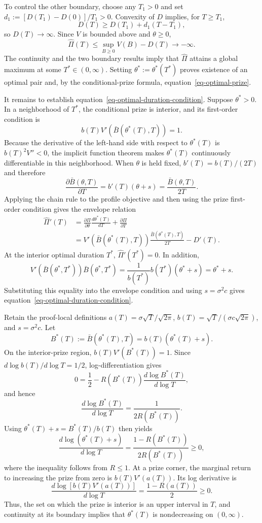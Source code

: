 \documentclass[mnsc]{informs3}
\begin{document}
\begin{APPENDICES}
To control the other boundary, choose any $T_1>0$ and set $d_1:=[D(T_1)-D(0)]/T_1>0$. Convexity of $D$ implies, for $T\geq T_1$,
\[
D(T)\geq D(T_1)+d_1(T-T_1),
\]
so $D(T)\to\infty$. Since $V$ is bounded above and $\theta\geq0$,
\[
\widehat\Pi(T)
\leq\sup_{B\geq0}V(B)-D(T)
\longrightarrow-\infty.
\]
The continuity and the two boundary results imply that $\widehat\Pi$ attains a global maximum at some $T^*\in(0,\infty)$. Setting $\theta^*:=\theta^*(T^*)$ proves existence of an optimal pair and, by the conditional-prize formula, equation~\eqref{eq-optimal-prize}.

It remains to establish equation~\eqref{eq-optimal-duration-condition}. Suppose $\theta^*>0$. In a neighborhood of $T^*$, the conditional prize is interior, and its first-order condition is
\[
b(T)V'\!\left(\bar B(\theta^*(T),T)\right)=1.
\]
Because the derivative of the left-hand side with respect to $\theta^*(T)$ is $b(T)^2V''<0$, the implicit function theorem makes $\theta^*(T)$ continuously differentiable in this neighborhood.
When $\theta$ is held fixed, $b'(T)=b(T)/(2T)$ and therefore
\[
\frac{\partial\bar B(\theta,T)}{\partial T}
=b'(T)(\theta+s)
=\frac{\bar B(\theta,T)}{2T}.
\]
Applying the chain rule to the profile objective and then using the prize first-order condition gives the envelope relation
\[
\begin{aligned}
\widehat\Pi'(T)
&=\frac{\partial\Pi}{\partial\theta}
\frac{d\theta^*(T)}{dT}
+\frac{\partial\Pi}{\partial T}\\
&=V'\!\left(\bar B(\theta^*(T),T)\right)
\frac{\bar B(\theta^*(T),T)}{2T}-D'(T).
\end{aligned}
\]
At the interior optimal duration $T^*$, $\widehat\Pi'(T^*)=0$. In addition,
\[
V'\!\left(\bar B(\theta^*,T^*)\right)\bar B(\theta^*,T^*)
=\frac{1}{b(T^*)}b(T^*)(\theta^*+s)
=\theta^*+s.
\]
Substituting this equality into the envelope condition and using $s=\sigma^2c$ gives equation~\eqref{eq-optimal-duration-condition}.
\Halmos
\endproof

Retain the proof-local definitions $a(T)=\sigma\sqrt T/\sqrt{2\pi}$, $b(T)=\sqrt T/(\sigma c\sqrt{2\pi})$, and $s=\sigma^2c$. Let
\[
B^*(T):=\bar B(\theta^*(T),T)=b(T)(\theta^*(T)+s).
\]
On the interior-prize region, $b(T)V'(B^*(T))=1$. Since $d\log b(T)/d\log T=1/2$, log-differentiation gives
\[
0=\frac12-R(B^*(T))\frac{d\log B^*(T)}{d\log T},
\]
and hence
\[
\frac{d\log B^*(T)}{d\log T}
=\frac{1}{2R(B^*(T))}.
\]
Using $\theta^*(T)+s=B^*(T)/b(T)$ then yields
\[
\frac{d\log(\theta^*(T)+s)}{d\log T}
=\frac{1-R(B^*(T))}{2R(B^*(T))}\geq0,
\]
where the inequality follows from $R\leq1$. At a prize corner, the marginal return to increasing the prize from zero is $b(T)V'(a(T))$. Its log derivative is
\[
\frac{d\log[b(T)V'(a(T))]}{d\log T}
=\frac{1-R(a(T))}{2}\geq0.
\]
Thus, the set on which the prize is interior is an upper interval in $T$, and continuity at its boundary implies that $\theta^*(T)$ is nondecreasing on $(0,\infty)$.


\end{APPENDICES}
\end{document}
